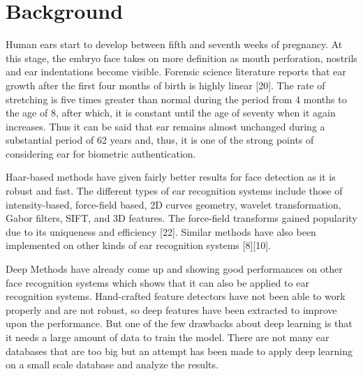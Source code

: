 \chapter{Background}
\label{sec:back}

Human ears start to develop between fifth and seventh weeks of pregnancy. At this stage, the embryo face takes on more definition as mouth perforation, nostrils and ear indentations become visible. Forensic science literature reports that ear growth after the first four months of birth is highly linear [20]. The rate of stretching is five times greater than normal during the period from 4 months to the age of 8, after which, it is constant until the age of seventy when it again increases. Thus it can be said that ear remains almost unchanged during a substantial period of 62 years and, thus, it is one of the strong points of considering ear for biometric authentication.

Haar-based methods have given fairly better results for face detection as it is robust and fast. The different types of ear recognition systems include those of intensity-based, force-field based, 2D curves geometry, wavelet transformation, Gabor filters, SIFT, and 3D features. The force-field transforms gained popularity due to its uniqueness and efficiency [22]. Similar methods have also been implemented on other kinds of ear recognition systems [8][10].

Deep Methods have already come up and showing good performances on other face recognition systems which shows that it can also be applied to ear recognition systems. Hand-crafted feature detectors have not been able to work properly and are not robust, so deep features have been extracted to improve upon the performance. But one of the few drawbacks about deep learning is that it needs a large amount of data to train the model. There are not many ear databases that are too big but an attempt has been made to apply deep learning on a small scale database and analyze the results.
